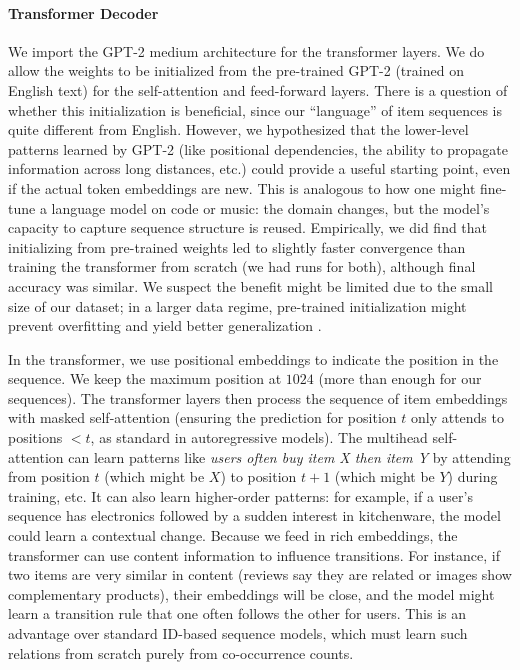 \documentclass[conference]{IEEEtran}
\begin{document}
\paragraph{Transformer Decoder} We import the GPT-2 medium architecture for the transformer layers. We do allow the weights to be initialized from the pre-trained GPT-2 (trained on English text) for the self-attention and feed-forward layers. There is a question of whether this initialization is beneficial, since our “language” of item sequences is quite different from English. However, we hypothesized that the lower-level patterns learned by GPT-2 (like positional dependencies, the ability to propagate information across long distances, etc.) could provide a useful starting point, even if the actual token embeddings are new. This is analogous to how one might fine-tune a language model on code or music: the domain changes, but the model’s capacity to capture sequence structure is reused. Empirically, we did find that initializing from pre-trained weights led to slightly faster convergence than training the transformer from scratch (we had runs for both), although final accuracy was similar. We suspect the benefit might be limited due to the small size of our dataset; in a larger data regime, pre-trained initialization might prevent overfitting and yield better generalization \cite{b7}. 

In the transformer, we use positional embeddings to indicate the position in the sequence. We keep the maximum position at $1024$ (more than enough for our sequences). The transformer layers then process the sequence of item embeddings with masked self-attention (ensuring the prediction for position $t$ only attends to positions $< t$, as standard in autoregressive models). The multihead self-attention can learn patterns like \textit{users often buy item X then item Y} by attending from position $t$ (which might be $X$) to position $t+1$ (which might be $Y$) during training, etc. It can also learn higher-order patterns: for example, if a user's sequence has electronics followed by a sudden interest in kitchenware, the model could learn a contextual change. Because we feed in rich embeddings, the transformer can use content information to influence transitions. For instance, if two items are very similar in content (reviews say they are related or images show complementary products), their embeddings will be close, and the model might learn a transition rule that one often follows the other for users. This is an advantage over standard ID-based sequence models, which must learn such relations from scratch purely from co-occurrence counts.
\end{document}

